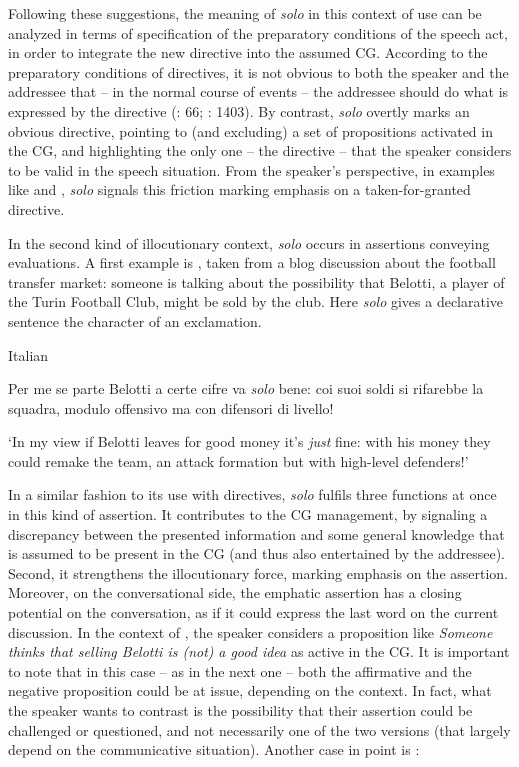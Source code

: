 Following these suggestions, the meaning of \textit{solo} in this context of use can be analyzed in terms of specification of the preparatory conditions of the speech act, in order to integrate the new directive into the assumed CG. According to the preparatory conditions of directives, it is not obvious to both the speaker and the addressee that – in the normal course of events – the addressee should do what is expressed by the directive (\citealt{Searle1969}: 66; \citealt{Waltereit2001}: 1403). By contrast, \textit{solo} overtly marks an obvious directive, pointing to (and excluding) a set of propositions activated in the CG, and highlighting the only one – the directive – that the speaker considers to be valid in the speech situation. From the speaker’s perspective, in examples like  and , \textit{solo} signals this friction marking emphasis on a taken-for-granted directive.

In the second kind of illocutionary context, \textit{solo} occurs in assertions conveying evaluations. A first example is , taken from a blog discussion about the football transfer market: someone is talking about the possibility that Belotti, a player of the Turin Football Club, might be sold by the club. Here \textit{solo} gives a declarative sentence the character of an exclamation.

\ea%
    \label{ex:key:94}

          Italian \citep[124]{Favaro2020}

Per me se parte Belotti a certe cifre va \textit{solo} bene: coi suoi soldi si rifarebbe la squadra, modulo offensivo ma con difensori di livello!

\glt ‘In my view if Belotti leaves for good money it’s \textit{just} fine: with his money they could remake the team, an attack formation but with high-level defenders!’
    \z %

In a similar fashion to its use with directives, \textit{solo} fulfils three functions at once in this kind of assertion. It contributes to the CG management, by signaling a discrepancy between the presented information and some general knowledge that is assumed to be present in the CG (and thus also entertained by the addressee). Second, it strengthens the illocutionary force, marking emphasis on the assertion. Moreover, on the conversational side, the emphatic assertion has a closing potential on the conversation, as if it could express the last word on the current discussion. In the context of , the speaker considers a proposition like \textit{Someone thinks that selling Belotti is (not)}\textbf{ }\textit{a good idea} as active in the CG. It is important to note that in this case – as in the next one – both the affirmative and the negative proposition could be at issue, depending on the context. In fact, what the speaker wants to contrast is the possibility that their assertion could be challenged or questioned, and not necessarily one of the two versions (that largely depend on the communicative situation). Another case in point is :

